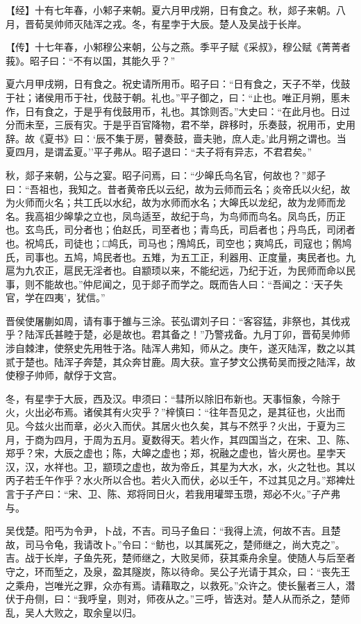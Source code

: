 \documentclass[]{article}
\begin{document}
【经】十有七年春，小邾子来朝。夏六月甲戌朔，日有食之。秋，郯子来朝。八月，晋荀吴帅师灭陆浑之戎。冬，有星孛于大辰。楚人及吴战于长岸。

【传】十七年春，小邾穆公来朝，公与之燕。季平子赋《采叔》，穆公赋《菁菁者莪》。昭子曰：``不有以国，其能久乎？''

夏六月甲戌朔，日有食之。祝史请所用币。昭子曰：``日有食之，天子不举，伐鼓于社；诸侯用币于社，伐鼓于朝。礼也。''平子御之，曰：``止也。唯正月朔，慝未作，日有食之，于是乎有伐鼓用币，礼也。其馀则否。''大史曰：``在此月也。日过分而未至，三辰有灾。于是乎百官降物，君不举，辟移时，乐奏鼓，祝用币，史用辞。故《夏书》曰：`辰不集于房，瞽奏鼓，啬夫驰，庶人走。'此月朔之谓也。当夏四月，是谓孟夏。''平子弗从。昭子退曰：``夫子将有异志，不君君矣。''

秋，郯子来朝，公与之宴。昭子问焉，曰：``少皞氏鸟名官，何故也？''郯子曰：``吾祖也，我知之。昔者黄帝氏以云纪，故为云师而云名；炎帝氏以火纪，故为火师而火名；共工氏以水纪，故为水师而水名；大皞氏以龙纪，故为龙师而龙名。我高祖少皞挚之立也，凤鸟适至，故纪于鸟，为鸟师而鸟名。凤鸟氏，历正也。玄鸟氏，司分者也；伯赵氏，司至者也；青鸟氏，司启者也；丹鸟氏，司闭者也。祝鸠氏，司徒也；□鸠氏，司马也；鳲鸠氏，司空也；爽鸠氏，司寇也；鹘鸠氏，司事也。五鸠，鸠民者也。五雉，为五工正，利器用、正度量，夷民者也。九扈为九农正，扈民无淫者也。自颛顼以来，不能纪远，乃纪于近，为民师而命以民事，则不能故也。''仲尼闻之，见于郯子而学之。既而告人曰：``吾闻之：`天子失官，学在四夷'，犹信。''

晋侯使屠蒯如周，请有事于雒与三涂。苌弘谓刘子曰：``客容猛，非祭也，其伐戎乎？陆浑氏甚睦于楚，必是故也。君其备之！''乃警戎备。九月丁卯，晋荀吴帅师涉自棘津，使祭史先用牲于洛。陆浑人弗知，师从之。庚午，遂灭陆浑，数之以其贰于楚也。陆浑子奔楚，其众奔甘鹿。周大获。宣子梦文公携荀吴而授之陆浑，故使穆子帅师，献俘于文宫。

冬，有星孛于大辰，西及汉。申须曰：``彗所以除旧布新也。天事恒象，今除于火，火出必布焉。诸侯其有火灾乎？''梓慎曰：``往年吾见之，是其征也，火出而见。今兹火出而章，必火入而伏。其居火也久矣，其与不然乎？火出，于夏为三月，于商为四月，于周为五月。夏数得天。若火作，其四国当之，在宋、卫、陈、郑乎？宋，大辰之虚也；陈，大皞之虚也；郑，祝融之虚也，皆火房也。星孛天汉，汉，水祥也。卫，颛顼之虚也，故为帝丘，其星为大水，水，火之牡也。其以丙子若壬午作乎？水火所以合也。若火入而伏，必以壬午，不过其见之月。''郑裨灶言于子产曰：``宋、卫、陈、郑将同日火，若我用瓘斝玉瓒，郑必不火。''子产弗与。

吴伐楚。阳丐为令尹，卜战，不吉。司马子鱼曰：``我得上流，何故不吉。且楚故，司马令龟，我请改卜。''令曰：``鲂也，以其属死之，楚师继之，尚大克之''。吉。战于长岸，子鱼先死，楚师继之，大败吴师，获其乘舟余皇。使随人与后至者守之，环而堑之，及泉，盈其隧炭，陈以待命。吴公子光请于其众，曰：``丧先王之乘舟，岂唯光之罪，众亦有焉。请藉取之，以救死。''众许之。使长鬣者三人，潜伏于舟侧，曰：``我呼皇，则对，师夜从之。''三呼，皆迭对。楚人从而杀之，楚师乱，吴人大败之，取余皇以归。
\end{document}

